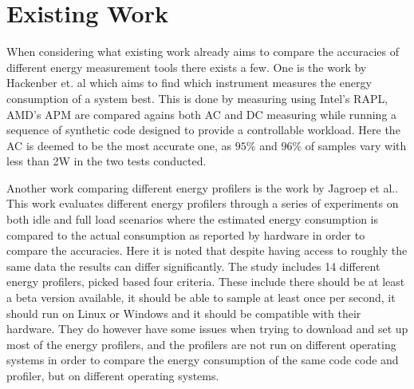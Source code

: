 
\section{Existing Work}

When considering what existing work already aims to compare the accuracies of different energy measurement tools there exists a few. One is the work by Hackenber et. al\cite[]{Hackenberg2013} which aims to find which instrument measures the energy consumption of a system best. This is done by measuring using Intel's RAPL, AMD's APM are compared agains both AC and DC measuring while running a sequence of synthetic code designed to provide a controllable workload. Here the AC is deemed to be the most accurate one, as $95\%$ and $96\%$ of samples vary with less than 2W in the two tests conducted.

Another work comparing different energy profilers is the work by Jagroep et al.\cite[]{Jagroep2015}. This work evaluates different energy profilers through a series of experiments on both idle and full load scenarios where the estimated energy consumption is compared to the actual consumption as reported by hardware in order to compare the accuracies. Here it is noted that despite having access to roughly the same data the results can differ significantly. The study includes 14 different energy profilers, picked based four criteria. These include there should be at least a beta version available, it should be able to sample at least once per second, it should run on Linux or Windows and it should be compatible with their hardware. They do however have some issues when trying to download and set up most of the energy profilers, and the profilers are not run on different operating systems in order to compare the energy consumption of the same code code and profiler, but on different operating systems.


